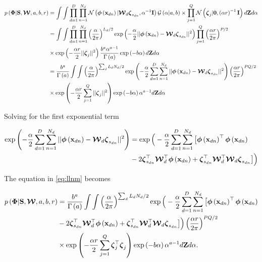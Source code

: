 \documentclass[]{article}
\newcommand{\gD}[2]{\mathcal{N}\left(#1,#2\right)}
\newcommand{\kernel}[2]{k\left(#1,#2\right)}
\newcommand{\catD}[2]{\mathcal{G}\left(#1,#2\right)}
\newcommand{\Z}{\boldsymbol{\mathrm{Z}}}
\newcommand{\gammaA}{\Gamma\left(a\right)}
\newcommand{\eye}{\mathbf{I}}
\newcommand{\Scluster}{\mathbf{S}}
\newcommand{\W}{\boldsymbol{\mathcal{W}}}
\newcommand{\indobj}{\mathbf{x}_{dn}}
\newcommand{\projMat}{\boldsymbol{\mathcal{W}}_d}
\newcommand{\lvec}{\boldsymbol{\zeta}_j}
\newcommand{\lvecs}{\boldsymbol{\zeta}_{s_{dn}}}
\newcommand{\phixnd}{\boldsymbol{\phi}\left(\indobj\right)}
\begin{document}
\begin{align}
p\left(\boldsymbol{\Phi}|\Scluster,\W,a,b,r\right) &=  \int \int \prod_{d=1}^{D}\prod_{n=1}^{N_d}{\gD{\phixnd|\projMat \lvecs}{\alpha^{-1}\eye}\catD{\alpha|a}{b}} \times \prod_{j=1}^{Q}\gD{\lvec|\mathbf{0}}{\left(\alpha r\right)^{-1}\eye}d\Z d\alpha  \notag \\
&=\int \int \prod_{d=1}^{D}\prod_{n=1}^{N_d}\left(\frac{\alpha}{2\pi}\right)^{L_d /2}\exp\left(-\frac{\alpha}{2}||\phixnd-\projMat\lvecs||^2\right) \prod_{j=1}^{Q}\left(\frac{\alpha r}{2\pi}\right)^{P/2} \notag \\
&\times \exp\left(-\frac{\alpha r}{2}||\lvec||^2\right)\frac{b^a \alpha^{a-1}}{\gammaA}\exp\left(-b\alpha\right)d\Z d\alpha \notag\\
&=\frac{b^a}{\gammaA}\int \int \left(\frac{\alpha}{2\pi}\right)^{\sum_d L_d N_d /2}\exp\left(-\frac{\alpha}{2} \sum_{d=1}^{D}\sum_{n=1}^{N_d}||\phixnd-\projMat\lvecs||^2\right)\left(\frac{\alpha r}{2\pi}\right)^{PQ/2} \notag \\
&\times \exp\left(-\frac{\alpha r}{2} \sum_{j=1}^{Q}||\lvec||^2\right)\exp\left(-b\alpha\right)\alpha^{a-1}d\Z d\alpha 
\label{eq:llnm}
\end{align}

Solving for the first exponential term

\begin{align}
\exp\left(-\frac{\alpha}{2} \sum_{d=1}^{D}\sum_{n=1}^{N_d}||\phixnd-\projMat\lvecs||^2\right) &= \exp\Big(-\frac{\alpha}{2} \sum_{d=1}^{D}\sum_{n=1}^{N_d}\big[ \phixnd^\top \phixnd  \notag\\
&  - 2 \lvecs ^\top \projMat^\top \phixnd + \lvecs^\top \projMat^\top \projMat \lvecs \big]\Big) \notag\\
\label{eq:exp_XWz}
\end{align}

The equation in \eqref{eq:llnm} becomes

\begin{align}
p\left(\boldsymbol{\Phi}|\Scluster,\W,a,b,r\right) &= \frac{b^a}{\gammaA}\int \int \left(\frac{\alpha}{2\pi}\right)^{\sum_d L_d N_d /2}\exp\Big(-\frac{\alpha}{2} \sum_{d=1}^{D}\sum_{n=1}^{N_d}\big[  \phixnd^\top \phixnd   \notag\\
&  - 2 \lvecs ^\top \projMat^\top \phixnd + \lvecs^\top \projMat^\top \projMat \lvecs \big]\Big)\left(\frac{\alpha r}{2\pi}\right)^{PQ/2} \notag \\
&\times \exp\left(-\frac{\alpha r}{2} \sum_{j=1}^{Q}\lvec^\top\lvec\right)\exp\left(-b\alpha\right)\alpha^{a-1}d\Z d\alpha.
\label{eq:llnm2}
\end{align}
\end{document}
